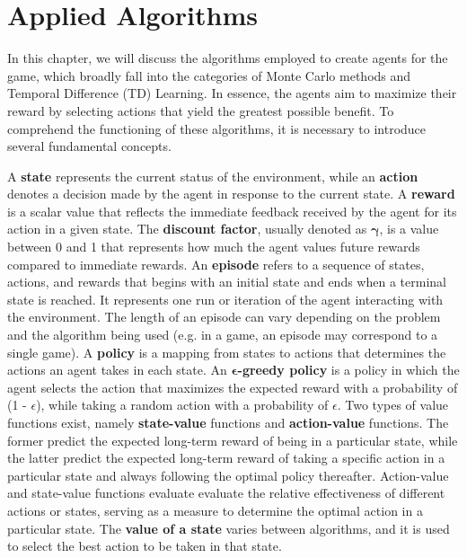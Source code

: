 \chapter{Applied Algorithms}
\label{applied_algo_chapter}
In this chapter, we will discuss the algorithms employed to create agents for the game, which broadly fall into the categories of Monte Carlo methods and Temporal Difference (TD) Learning. In essence, the agents aim to maximize their reward by selecting actions that yield the greatest possible benefit. To comprehend the functioning of these algorithms, it is necessary to introduce several fundamental concepts. 

A \textbf{state} represents the current status of the environment, while an \textbf{action} denotes a decision made by the agent in response to the current state. A \textbf{reward} is a scalar value that reflects the immediate feedback received by the agent for its action in a given state. The \textbf{discount factor}, usually denoted as $\bm{\gamma}$, is a value between 0 and 1 that represents how much the agent values future rewards compared to immediate rewards. An \textbf{episode} refers to a sequence of states, actions, and rewards that begins with an initial state and ends when a terminal state is reached. It represents one run or iteration of the agent interacting with the environment. The length of an episode can vary depending on the problem and the algorithm being used (e.g. in a game, an episode may correspond to a single game). A \textbf{policy} is a mapping from states to actions that determines the actions an agent takes in each state. An \textbf{$\bm{\epsilon}$-greedy policy} is a policy in which the agent selects the action that maximizes the expected reward with a probability of (1 - $\epsilon$), while taking a random action with a probability of $\epsilon$. Two types of value functions exist, namely \textbf{state-value} functions and \textbf{action-value} functions. The former predict the expected long-term reward of being in a particular state, while the latter predict the expected long-term reward of taking a specific action in a particular state and always following the optimal policy thereafter. Action-value and state-value functions evaluate evaluate the relative effectiveness of different actions or states, serving as a measure to determine the optimal action in a particular state. The \textbf{value of a state} varies between algorithms, and it is used to select the best action to be taken in that state. 

